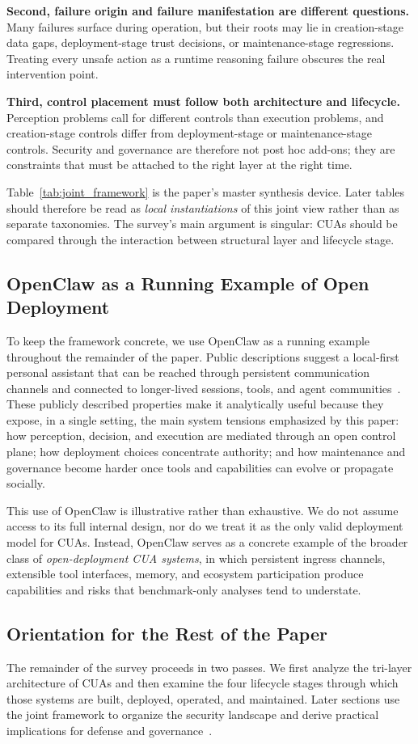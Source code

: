 \textbf{Second, failure origin and failure manifestation are different questions.} Many failures surface during operation, but their roots may lie in creation-stage data gaps, deployment-stage trust decisions, or maintenance-stage regressions. Treating every unsafe action as a runtime reasoning failure obscures the real intervention point.

\textbf{Third, control placement must follow both architecture and lifecycle.} Perception problems call for different controls than execution problems, and creation-stage controls differ from deployment-stage or maintenance-stage controls. Security and governance are therefore not post hoc add-ons; they are constraints that must be attached to the right layer at the right time.

Table~\ref{tab:joint_framework} is the paper's master synthesis device. Later tables should therefore be read as \emph{local instantiations} of this joint view rather than as separate taxonomies. The survey's main argument is singular: CUAs should be compared through the interaction between structural layer and lifecycle stage.

\subsection{OpenClaw as a Running Example of Open Deployment}
To keep the framework concrete, we use OpenClaw as a running example throughout the remainder of the paper. Public descriptions suggest a local-first personal assistant that can be reached through persistent communication channels and connected to longer-lived sessions, tools, and agent communities~\cite{openclaw2026website,ibm2026openclaw,chen2026openclaw}. These publicly described properties make it analytically useful because they expose, in a single setting, the main system tensions emphasized by this paper: how perception, decision, and execution are mediated through an open control plane; how deployment choices concentrate authority; and how maintenance and governance become harder once tools and capabilities can evolve or propagate socially.

This use of OpenClaw is illustrative rather than exhaustive. We do not assume access to its full internal design, nor do we treat it as the only valid deployment model for CUAs. Instead, OpenClaw serves as a concrete example of the broader class of \emph{open-deployment CUA systems}, in which persistent ingress channels, extensible tool interfaces, memory, and ecosystem participation produce capabilities and risks that benchmark-only analyses tend to understate.

\subsection{Orientation for the Rest of the Paper}
The remainder of the survey proceeds in two passes. We first analyze the tri-layer architecture of CUAs and then examine the four lifecycle stages through which those systems are built, deployed, operated, and maintained. Later sections use the joint framework to organize the security landscape and derive practical implications for defense and governance~\cite{kuntz2025harm,zheng2026riskybench,wang2026asset}.
